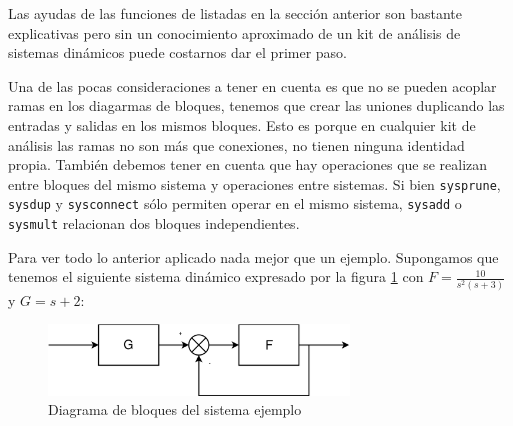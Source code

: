 \label{sec:EjRealimentado}

Las ayudas de las funciones de listadas en la sección anterior son
bastante explicativas pero sin un conocimiento aproximado de un kit de
análisis de sistemas dinámicos puede costarnos dar el primer paso.

Una de las pocas consideraciones a tener en cuenta es que no se pueden
acoplar ramas en los diagarmas de bloques, tenemos que crear las
uniones duplicando las entradas y salidas en los mismos bloques. Esto
es porque en cualquier kit de análisis las ramas no son más que
conexiones, no tienen ninguna identidad propia. También debemos tener
en cuenta que hay operaciones que se realizan entre bloques del mismo
sistema y operaciones entre sistemas. Si bien \texttt{sysprune},
\texttt{sysdup} y \texttt{sysconnect} sólo permiten operar en el mismo
sistema, \texttt{sysadd} o \texttt{sysmult} relacionan dos bloques
independientes.

Para ver todo lo anterior aplicado nada mejor que un ejemplo.
Supongamos que tenemos el siguiente sistema dinámico expresado por la
figura \ref{cap:DBloques} con $F=\frac{10}{s^{2}(s+3)}$ y $G=s+2$:

%
\begin{figure}

  \centering{} \includegraphics[width=8cm,
  keepaspectratio]{figuras/sistema1}



  \caption{\label{cap:DBloques}Diagrama de bloques del sistema
    ejemplo}
\end{figure}



